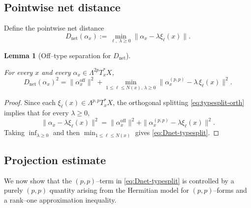 \documentclass[11pt]{article}
\numberwithin{equation}{section}  %
\theoremstyle{plain}
\newtheorem{lemma}[theorem]{Lemma}
\theoremstyle{definition}
\theoremstyle{remark}
\begin{document}
\subsection*{Pointwise net distance}

Define the pointwise net distance
\[
D_{\mathrm{net}}(\alpha_{x})
:=
\min_{\ell,\;\lambda\ge 0}
\|\alpha_{x} - \lambda\xi_{\ell}(x)\|.
\]

\begin{lemma}[Off--type separation for $D_{\mathrm{net}}$]\label{lem:typesplit}

For every $x$ and every $\alpha_{x}\in\Lambda^{2p}T^{*}_{x}X$,
\begin{equation}\label{eq:Dnet-typesplit}
D_{\mathrm{net}}(\alpha_{x})^{2}
=
\|\alpha_{x}^{\mathrm{off}}\|^{2}
+
\min_{1\le \ell\le N(x),\,\lambda\ge 0}
\bigl\|\alpha_{x}^{(p,p)} - \lambda \,\xi_{\ell}(x)\bigr\|^{2}.
\tag{22}
\end{equation}

\end{lemma}


\begin{proof}

Since each $\xi_\ell(x)\in\Lambda^{p,p}T_x^*X$, the orthogonal splitting
\eqref{eq:typesplit-orth} implies that for every $\lambda\ge 0$,
\[
\|\alpha_x-\lambda\xi_\ell(x)\|^2
=
\|\alpha_x^{\mathrm{off}}\|^2
+
\|\alpha_x^{(p,p)}-\lambda\xi_\ell(x)\|^2.
\]
Taking $\inf_{\lambda\ge 0}$ and then $\min_{1\le \ell\le N(x)}$ gives \eqref{eq:Dnet-typesplit}.

\end{proof}

\subsection*{Projection estimate}

We now show that the $(p,p)$--term in \eqref{eq:Dnet-typesplit}
is controlled by a purely $(p,p)$ quantity arising from the Hermitian
model for $(p,p)$--forms and a rank--one approximation inequality.
\end{document}
